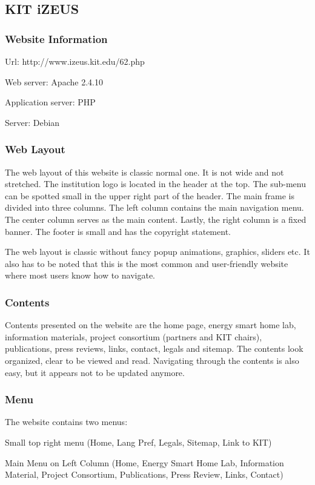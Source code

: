 \subsection{KIT iZEUS}
\subsubsection*{Website Information}
\begin{itemize*}
\item Url: http://www.izeus.kit.edu/62.php
\item Web server: Apache 2.4.10
\item Application server: PHP
\item Server: Debian
\end{itemize*}

\subsubsection*{Web Layout}
The web layout of this website \cite{Multin.2012} is classic normal one. It is not wide and not stretched. The institution logo is located in the header at the top. The sub-menu can be spotted small in the upper right part of the header. The main frame is divided into three columns. The left column contains the main navigation menu. The center column serves as the main content. Lastly, the right column is a fixed banner. The footer is small and has the copyright statement.

The web layout is classic without fancy popup animations, graphics, sliders etc. It also has to be noted that this is the most common and user-friendly website where most users know how to navigate.

\subsubsection*{Contents}
Contents presented on the website are the home page, energy smart home lab, information materials, project consortium (partners and KIT chairs), publications, press reviews, links, contact, legals and sitemap. The contents look organized, clear to be viewed and read. Navigating through the contents is also easy, but it appears not to be updated anymore.

\subsubsection*{Menu}
The website contains two menus:
\begin{itemize*}
\item Small top right menu (Home, Lang Pref, Legals, Sitemap, Link to KIT)
\item Main Menu on Left Column (Home, Energy Smart Home Lab, Information Material, Project Consortium, Publications, Press Review, Links, Contact)
\end{itemize*}

